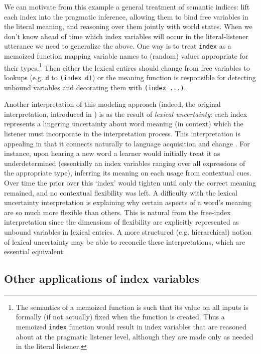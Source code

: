 \documentclass[pdfextras]{handbook}
\begin{document}
We can motivate from this example a general treatment of semantic indices: lift each index into the pragmatic inference, allowing them to bind free variables in the literal meaning, and reasoning over them jointly with world states. 
When we don't know ahead of time which index variables will occur in the literal-listener utterance we need to generalize the above. 
One way is to treat \lstinline{index} as a memoized function mapping variable names to (random) values appropriate for their types.\footnote{The semantics of a memoized function is such that its value on all inputs is formally (if not actually) fixed when the function is created. Thus a memoized \lstinline{index} function would result in index variables that are reasoned about at the pragmatic listener level, although they are made only as needed in the literal listener.} 
Then either the lexical entires should change from free variables to lookups (e.g. \lstinline{d} to \lstinline{(index d)}) or the meaning function is responsible for detecting unbound variables and decorating them with \lstinline[mathescape]{(index ...)}.

Another interpretation of this modeling approach (indeed, the original interpretation, introduced in \cite{Bergen2012}) is as the result of \emph{lexical uncertainty}: each index represents a lingering uncertainty about word meaning (in context) which the listener must incorporate in the interpretation process. This interpretation is appealing in that it connects naturally to language acquisition and change \cite{SmithFrankGoodman}. For instance, upon hearing a new word a learner would initially treat it as underdetermined (essentially an index variables ranging over all expressions of the appropriate type), inferring its meaning on each usage from contextual cues. Over time the prior over this `index' would tighten until only the correct meaning remained, and no contextual flexibility was left. A difficulty with the lexical uncertainty interpretation is explaining why certain aspects of a word's meaning are so much more flexible than others. This is natural from the free-index interpretation since the dimensions of flexibility are explicitly represented as unbound variables in lexical entries. A more structured (e.g. hierarchical) notion of lexical uncertainty may be able to reconcile these interpretations, which are essential equivalent.


\subsection{Other applications of index variables}
\end{document}
